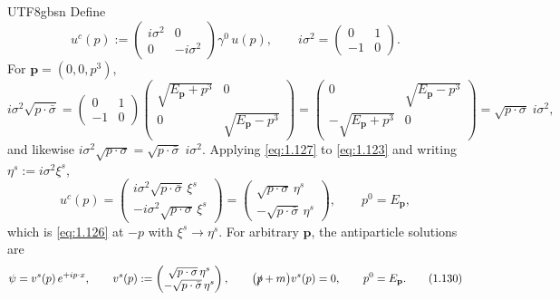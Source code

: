 \documentclass[11pt,a4paper,oneside]{report}
\begin{document}
\begin{CJK*}{UTF8}{gbsn}
Define
\begin{equation*}
u^c(p):=\begin{pmatrix}i\sigma^2&0\\0&-i\sigma^2\end{pmatrix}\gamma^0\,u(p),
\qquad
i\sigma^2=\begin{pmatrix}0&1\\-1&0\end{pmatrix}.
\tag{1.127}\label{eq:1.127}
\end{equation*}
For $\mathbf p=(0,0,p^3)$,
\begin{equation*}
i\sigma^2\sqrt{p\cdot\bar\sigma}
=\begin{pmatrix}0&1\\-1&0\end{pmatrix}\begin{pmatrix}\sqrt{E_{\mathbf p}+p^3}&0\\0&\sqrt{E_{\mathbf p}-p^3}\end{pmatrix}
=\begin{pmatrix}0&\sqrt{E_{\mathbf p}-p^3}\\-\sqrt{E_{\mathbf p}+p^3}&0\end{pmatrix}
=\sqrt{p\cdot\sigma}\;i\sigma^2,
\tag{1.128}\label{eq:1.128}
\end{equation*}
and likewise $i\sigma^2\sqrt{p\cdot\sigma}=\sqrt{p\cdot\bar\sigma}\;i\sigma^2$. Applying \eqref{eq:1.127} to \eqref{eq:1.123} and writing $\eta^s:=i\sigma^2\xi^s$,
\begin{equation*}
u^c(p)=\begin{pmatrix}i\sigma^2\sqrt{p\cdot\bar\sigma}\,\xi^s\\-i\sigma^2\sqrt{p\cdot\sigma}\,\xi^s\end{pmatrix}
=\begin{pmatrix}\sqrt{p\cdot\sigma}\,\eta^s\\-\sqrt{p\cdot\bar\sigma}\,\eta^s\end{pmatrix},
\qquad p^0=E_{\mathbf p},
\tag{1.129}\label{eq:1.129}
\end{equation*}
which is \eqref{eq:1.126} at $-p$ with $\xi^s\to\eta^s$. For arbitrary $\mathbf p$, the antiparticle solutions are
\begin{equation*}
{\displaystyle 
\psi=v^s(p)\,e^{+ip\cdot x},\qquad
v^s(p):=\begin{pmatrix}\sqrt{p\cdot\sigma}\,\eta^s\\-\sqrt{p\cdot\bar\sigma}\,\eta^s\end{pmatrix},\qquad
\bigl(\slashed{p}+m\bigr)v^s(p)=0,\qquad
p^0=E_{\mathbf p}.
}
\tag{1.130}\label{eq:1.130}
\end{equation*}


\end{CJK*}
\end{document}
